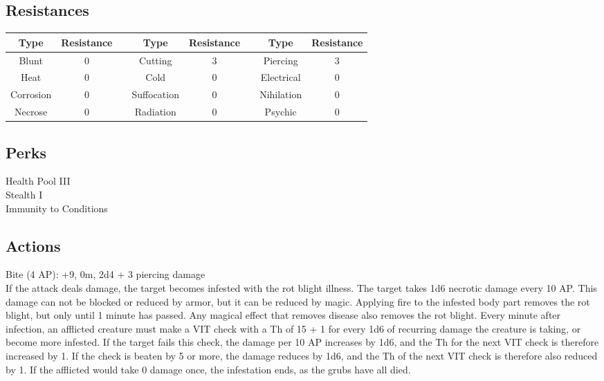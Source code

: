 \subsection{Resistances}
\begin{minipage}[H]{1\textwidth}
	\centering
	\begin{tabular}[c]{|c | c | c | c | c | c | c | c|}
		\hline
		Type & Resistance && Type & Resistance && Type & Resistance\\
		\hline
		Blunt & 0 &&
		Cutting & 3 &&
		Piercing & 3\\
		Heat & 0 &&
		Cold & 0 &&
		Electrical & 0\\
		Corrosion & 0 &&
		Suffocation & 0 &&
		Nihilation & 0 \\
		Necrose & 0 &&
		Radiation & 0 &&
		Psychic & 0\\
		\hline
	\end{tabular}
\end{minipage}

\subsection{Perks}
Health Pool III\\
Stealth I\\
Immunity to Conditions\\

\subsection{Actions}
Bite (4 AP): +9, 0m, 2d4 + 3 piercing damage\\
If the attack deals damage, the target becomes infested with the rot blight illness.
The target takes 1d6 necrotic damage every 10 AP.
This damage can not be blocked or reduced by armor, but it can be reduced by magic.
Applying fire to the infested body part removes the rot blight, but only until 1 minute has passed.
Any magical effect that removes disease also removes the rot blight.
Every minute after infection, an afflicted creature must make a VIT check with a Th of 15 + 1 for every 1d6 of recurring damage the creature is taking, or become more infested.
If the target fails this check, the damage per 10 AP increases by 1d6, and the Th for the next VIT check is therefore increased by 1.
If the check is beaten by 5 or more, the damage reduces by 1d6, and the Th of the next VIT check is therefore also reduced by 1.
If the afflicted would take 0 damage once, the infestation ends, as the grubs have all died.
\pagebreak